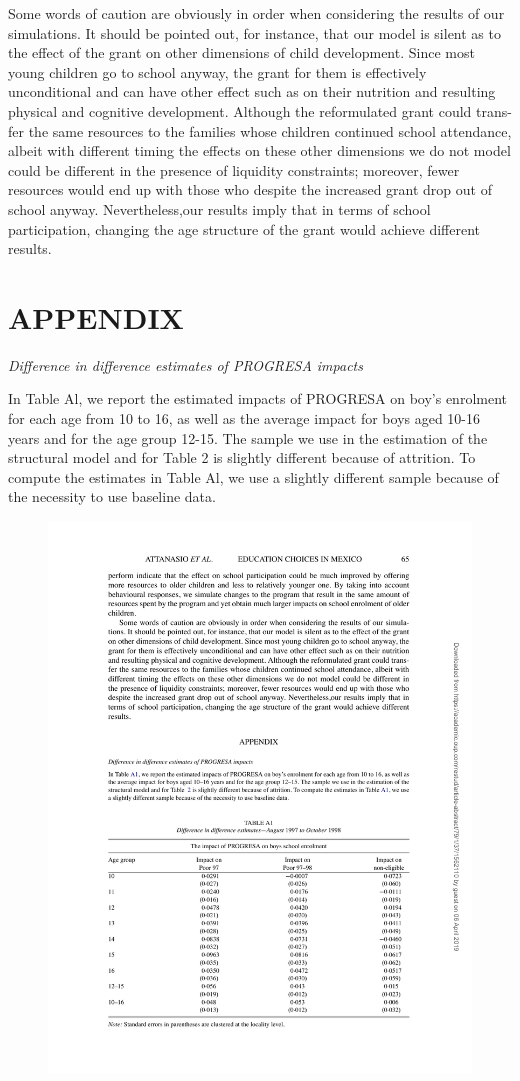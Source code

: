 \documentclass{handoutForSolutions}
\begin{document}
Some words of caution are obviously in order when considering the results of our simulations. It should be pointed out, for instance, that our model is silent as to the effect of the grant on other dimensions of child development. Since most young children go to school anyway, the grant for them is effectively unconditional and can have other effect such as on their nutrition and resulting physical and cognitive development. Although the reformulated grant could trans- fer the same resources to the families whose children continued school attendance, albeit with different timing the effects on these other dimensions we do not model could be different in the presence of liquidity constraints; moreover, fewer resources would end up with those who despite the increased grant drop out of school anyway. Nevertheless,our results imply that in terms of school participation, changing the age structure of the grant would achieve different results.

\newpage

\section*{APPENDIX}
{\it Difference in difference estimates of PROGRESA impacts}

In Table Al, we report the estimated impacts of PROGRESA on boy's enrolment for each age from 10 to 16, as well as the average impact for boys aged 10-16 years and for the age group 12-15. The sample we use in the estimation of the structural model and for Table 2 is slightly different because of attrition. To compute the estimates in Table Al, we use a slightly different sample because of the necessity to use baseline data.
\begin{figure}[H]
\centering
\includegraphics[width=0.75\linewidth]{image/AttanasioMeghir Santiago2011Figure9.pdf}
\end{figure}
\end{document}
